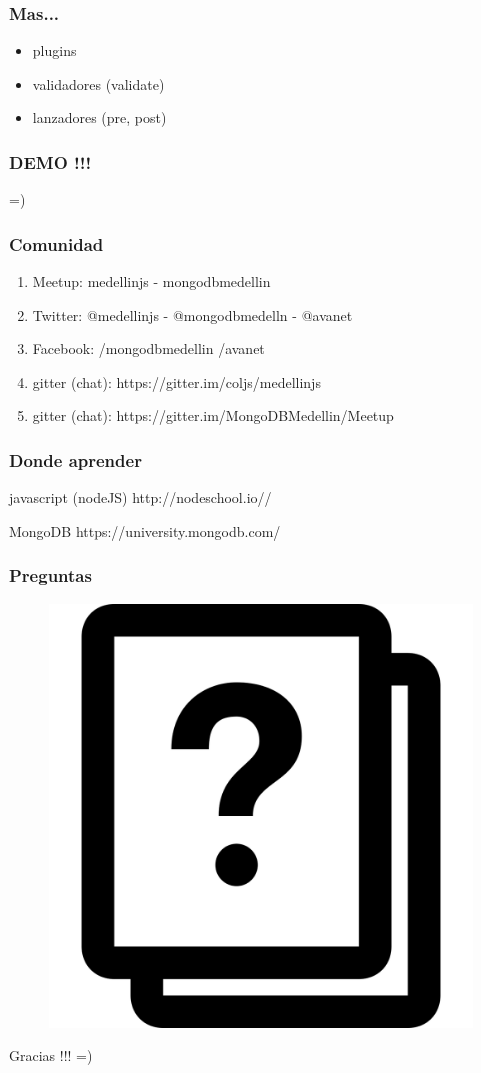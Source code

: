 \documentclass{beamer}
\begin{document}
\begin{frame}
\frametitle{Mas...}
\begin{itemize}[<+->]
\item plugins
\item validadores (validate)
\item lanzadores (pre, post)
\end{itemize}
\end{frame}

\begin{frame}
\frametitle{DEMO !!!}
=)
\end{frame}

\begin{frame}
\frametitle{Comunidad}
\begin{enumerate}
\item Meetup: medellinjs  - mongodbmedellin
\pause
\item Twitter: @medellinjs - @mongodbmedelln - @avanet
\pause
\item Facebook: /mongodbmedellin /avanet
\pause
\item gitter (chat): https://gitter.im/coljs/medellinjs
\pause
\item gitter (chat): https://gitter.im/MongoDBMedellin/Meetup
\end{enumerate}
\end{frame}
\begin{frame}
\frametitle{Donde aprender}
\footnotesize{
\begin{thebibliography}{99} %
 javascript (nodeJS)
\newblock http://nodeschool.io//
\end{thebibliography}
}

\footnotesize{
\begin{thebibliography}{99} %
 MongoDB
\newblock https://university.mongodb.com/
\end{thebibliography}
}
\end{frame}

\begin{frame}
\frametitle{Preguntas}
\begin{figure}
\includegraphics[width=0.4\linewidth]{preguntas.png}
\end{figure}
\end{frame}

\begin{frame}
\Huge{\centerline{Gracias !!! =)}}
\end{frame}
\end{document}

